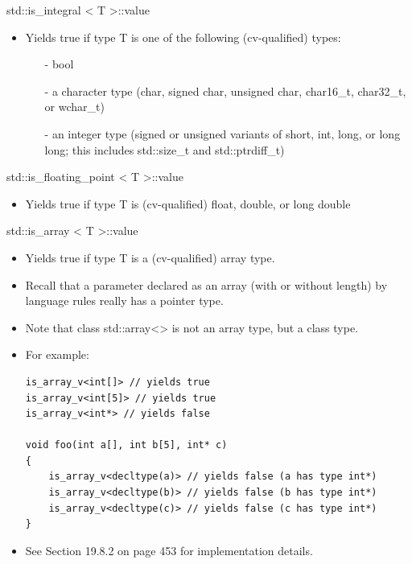 std::is\_integral < T >::value

\begin{itemize}
\item 
Yields true if type T is one of the following (cv-qualified) types:

\begin{itemize}
\item [-]
bool

\item [-]
 a character type (char, signed char, unsigned char, char16\_t, char32\_t, or wchar\_t)

\item [-]
an integer type (signed or unsigned variants of short, int, long, or long long; this includes std::size\_t and std::ptrdiff\_t)
\end{itemize}

\end{itemize}

std::is\_floating\_point < T >::value

\begin{itemize}
\item 
Yields true if type T is (cv-qualified) float, double, or long double
\end{itemize}

std::is\_array < T >::value

\begin{itemize}
\item 
Yields true if type T is a (cv-qualified) array type.

\item 
Recall that a parameter declared as an array (with or without length) by language rules really has a pointer type.

\item 
Note that class std::array<> is not an array type, but a class type.

\item 
For example:

\begin{lstlisting}[style=styleCXX]
is_array_v<int[]> // yields true
is_array_v<int[5]> // yields true
is_array_v<int*> // yields false

void foo(int a[], int b[5], int* c)
{
	is_array_v<decltype(a)> // yields false (a has type int*)
	is_array_v<decltype(b)> // yields false (b has type int*)
	is_array_v<decltype(c)> // yields false (c has type int*)
}
\end{lstlisting}

\item 
See Section 19.8.2 on page 453 for implementation details.

\end{itemize}

